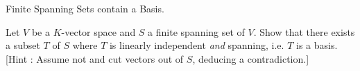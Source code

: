 \documentclass[../../book.tex]{subfiles}
\begin{document}
\begin{ex} Finite Spanning Sets contain a Basis. 
    
    Let $V$ be a $K$-vector space and 
    $S$ a finite spanning set of $V$. 
    Show that there exists a subset $T$ of $S$ where 
    $T$ is linearly independent \emph{and} spanning, 
    i.e. $T$ is a basis. 
    [Hint : Assume not and cut vectors out of $S$, deducing a contradiction.]

\end{ex}
\end{document}
